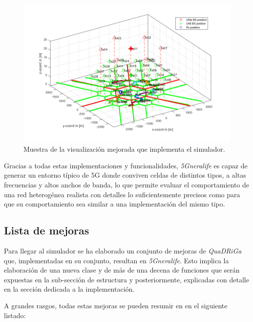 \begin{figure}[h!]
	\centering
    \includegraphics[width=\linewidth]{imagenes/muestra_visualizacion.png}
	\caption{Muestra de la visualización mejorada que implementa el simulador.}
	\label{fig:muestra_visualizacion}
\end{figure}

Gracias a todas estas implementaciones y funcionalidades, \textit{5Gneralife} es capaz de generar un entorno típico de 5G donde conviven celdas de distintos tipos, a altas frecuencias y altos anchos de banda, lo que permite evaluar el comportamiento de una red heterogénea realista con detalles lo suficientemente precisos como para que su comportamiento sea similar a una implementación del mismo tipo. 

\subsection{Lista de mejoras}

Para llegar al simulador se ha elaborado un conjunto de mejoras de \textit{QuaDRiGa} que, implementadas en su conjunto, resultan en \textit{5Gneralife}. Esto implica la elaboración de una nueva clase y de más de una decena de funciones que serán expuestas en la sub-sección de estructura y posteriormente, explicadas con detalle en la sección dedicada a la implementación.

A grandes rasgos, todas estas mejoras se pueden resumir en en el siguiente listado:

